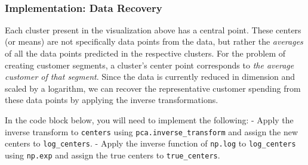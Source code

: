 \documentclass{article}
\begin{document}
    \begin{center}
    \end{center}
    { \hspace*{\fill} \\}
    
    \subsubsection{Implementation: Data
Recovery}\label{implementation-data-recovery}

Each cluster present in the visualization above has a central point.
These centers (or means) are not specifically data points from the data,
but rather the \emph{averages} of all the data points predicted in the
respective clusters. For the problem of creating customer segments, a
cluster's center point corresponds to \emph{the average customer of that
segment}. Since the data is currently reduced in dimension and scaled by
a logarithm, we can recover the representative customer spending from
these data points by applying the inverse transformations.

In the code block below, you will need to implement the following: -
Apply the inverse transform to \texttt{centers} using
\texttt{pca.inverse\_transform} and assign the new centers to
\texttt{log\_centers}. - Apply the inverse function of \texttt{np.log}
to \texttt{log\_centers} using \texttt{np.exp} and assign the true
centers to \texttt{true\_centers}.
\end{document}
